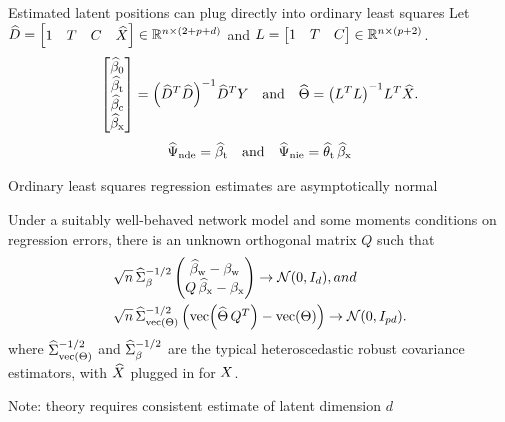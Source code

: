 \documentclass[aspectratio=169]{beamer}
\theoremstyle{remark}
\begin{document}
\begin{frame}{Estimated latent positions can plug directly into ordinary least squares}
    Let $\widehat{D} = \begin{bmatrix} 1 & T & C  & \widehat{X} \end{bmatrix} \in \mathbb{R}^{n \times (2 + p + d)}$ and $L = \begin{bmatrix} 1 & T & C \end{bmatrix} \in \mathbb{R}^{n \times (p + 2)}$.
    \begin{equation*}
        \begin{bmatrix}
            \betazerohat \\
            \betathat    \\
            \betachat    \\
            \betaxhat
        \end{bmatrix}
        = \paren*{\Dhat^T \Dhat}^{-1} \Dhat^T Y
        \quad \text{and} \quad
        \Thetahat
        = \paren*{\Wfull^T \Wfull}^{-1} \Wfull^T \Xhat.
    \end{equation*}
    \begin{align*}
        \widehat{\Psi}_\mathrm{nde} = \widehat{\beta}_\text{t} \quad \text{and} \quad \widehat{\Psi}_\mathrm{nie} = \widehat{\theta}_\text{t} \, \widehat{\beta}_\text{x}
    \end{align*}
\end{frame}

\begin{frame}{Ordinary least squares regression estimates are asymptotically normal}
    \begin{theorem}
        Under a suitably well-behaved network model and some moments conditions on regression errors, there is an unknown orthogonal matrix $Q$ such that
        \begin{equation*}
            \begin{aligned}
                \sqrt{ n } \,
                 & \Sigmahatbeta^{-1/2}
                \begin{pmatrix}
                    \betawhat - \betaw \\
                    Q \, \betaxhat - \betax
                \end{pmatrix}
                \to
                \Normal{0}{I_d}, and     \\
                \sqrt{ n } \,
                 & \Sigmahattheta^{-1/2}
                \begin{pmatrix}
                    \vecc \paren*{\Thetahat \, Q^T} - \Thetavec
                \end{pmatrix}
                \to
                \Normal{0}{I_{p d}}.
            \end{aligned}
        \end{equation*}
        \noindent where $\widehat{\Sigma}_{\operatorname*{vec} \left(\Theta\right)}^{-1/2}$ and $\widehat{\Sigma}_\beta^{-1/2}$ are the typical heteroscedastic robust covariance estimators, with $\widehat{X}$ plugged in for $X$.
    \end{theorem}

    \centering
    Note: theory requires consistent estimate of latent dimension $d$
\end{frame}
\end{document}
